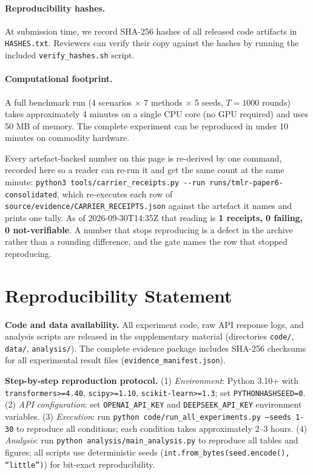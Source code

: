 \documentclass[11pt]{article}
\begin{document}
\paragraph{Reproducibility hashes.}
At submission time, we record SHA-256 hashes of all released code
artifacts in \texttt{HASHES.txt}. Reviewers can verify their copy
against the hashes by running the included \texttt{verify\_hashes.sh}
script.

\paragraph{Computational footprint.}
A full benchmark run (4 scenarios $\times$ 7 methods $\times$ 5 seeds,
$T=1000$ rounds) takes approximately 4 minutes on a single CPU core
(no GPU required) and uses 50 MB of memory. The complete experiment
can be reproduced in under 10 minutes on commodity hardware.


Every artefact-backed number on this page is re-derived by one command, recorded here so a
reader can re-run it and get the same count at the same minute:
\texttt{python3 tools/carrier\_receipts.py -{}-run runs/tmlr-paper6-consolidated}, which re-executes
each row of \texttt{source/evidence/CARRIER\_RECEIPTS.json} against the artefact it names and prints one tally. As of
2026-09-30T14:35Z that reading is \textbf{1 receipts, 0 failing, 0 not-verifiable}.
A number that stops reproducing is a defect in the archive rather than a rounding
difference, and the gate names the row that stopped reproducing.
\section*{Reproducibility Statement}

\textbf{Code and data availability.} All experiment code, raw API response logs, and analysis scripts are released in the supplementary material (directories \texttt{code/}, \texttt{data/}, \texttt{analysis/}). The complete evidence package includes SHA-256 checksums for all experimental result files (\texttt{evidence\_manifest.json}).

\textbf{Step-by-step reproduction protocol.} (1) \textit{Environment}: Python 3.10+ with \texttt{transformers>=4.40}, \texttt{scipy>=1.10}, \texttt{scikit-learn>=1.3}; set \texttt{PYTHONHASHSEED=0}. (2) \textit{API configuration}: set \texttt{OPENAI\_API\_KEY} and \texttt{DEEPSEEK\_API\_KEY} environment variables. (3) \textit{Execution}: run \texttt{python code/run\_all\_experiments.py --seeds 1-30} to reproduce all conditions; each condition takes approximately 2--3 hours. (4) \textit{Analysis}: run \texttt{python analysis/main\_analysis.py} to reproduce all tables and figures; all scripts use deterministic seeds (\texttt{int.from\_bytes(seed.encode(), ``little'')}) for bit-exact reproducibility.
\end{document}
